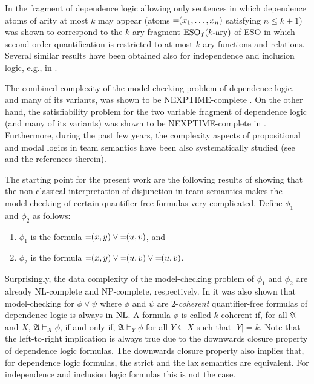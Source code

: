 \documentclass{article}
\theoremstyle{plain}
\theoremstyle{definition}
\newcommand{\mA}{{\mathfrak A}}
\newcommand*\dep{{=\mkern-1.2mu}}
\newcommand{\ESOfarity}[1]{{\rm ESO}_f({#1}\mbox{-ary})}
\newcommand{\nl}{{\rm NL}}
\begin{document}
 In \cite{durand11} the fragment of dependence logic allowing only sentences in which dependence atoms of arity at most $k$ may appear (atoms  $\dep(x_1,\ldots, x_n)$ satisfying $n\le k+1$) was shown to correspond to the $k$-ary fragment  $\ESOfarity{k}$ of ESO in which second-order quantification is restricted to at most $k$-ary functions and relations.  
Several  similar results have been obtained  also for independence and inclusion logic, e.g.,  in \cite{galhankon13,DBLP:journals/corr/HannulaK14,Ronnholm18,Ronnholm19}.

 The combined complexity of the model-checking problem of dependence logic, and many of its variants, was shown to be NEXPTIME-complete \cite{gradel12}. On the other hand, the satisfiability problem for the two variable fragment of dependence logic (and many of its variants) was shown to be NEXPTIME-complete in \cite{KontinenKLV11, KontinenKV14}. Furthermore,  during the past few years, the complexity aspects of propositional and modal logics in team semantics have been also systematically studied (see \cite{Luck19,HannulaKVV18} and the references therein). 


The starting point for the present work are the following results of \cite{kontinenj13} showing that the non-classical interpretation of disjunction in team semantics makes the model-checking of certain quantifier-free
formulas very complicated.  Define $\phi_1$ and $\phi_2$ as follows:
\begin{enumerate}
\item $\phi_1$ is the formula $\dep(x,y)\vee\dep(u,v)$, and
\item\label{phi2} $\phi_2$ is  the formula $ \dep(x,y)\vee\dep(u,v)\vee \dep(u,v)$.
\end{enumerate}
Surprisingly, the data complexity of the model-checking problem of $\phi_1$ and $\phi_2$   are already  NL-complete and NP-complete, respectively. In  \cite{kontinenj13} it was also shown that  model-checking for $\phi \vee \psi$ where $\phi$ and $\psi$ are $2$-\emph{coherent} quantifier-free formulas of dependence logic is always in $\nl$. A formula $\phi$ is  called $k$-coherent if, for all $\mA$ and $X$,  $\mA\models_X \phi$, if and only if,   
$\mA\models_Y \phi$ for all $Y\subseteq X$ such that $|Y|=k$. Note that the left-to-right implication is always true due to the downwards closure property of dependence logic formulas. The  downwards closure property also implies that, for dependence logic formulas,  the strict and the lax semantics are equivalent. For independence and inclusion logic formulas this is not the case.
\end{document}
